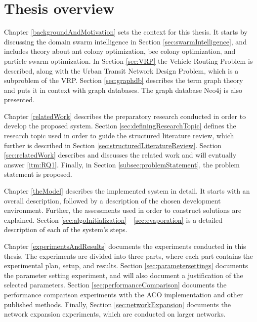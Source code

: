 \section{Thesis overview}



Chapter \ref{backgroundAndMotivation} sets the context for this thesis. It starts by discussing the domain swarm intelligence in Section \ref{sec:swarmIntelligence}, and includes theory about ant colony optimization, bee colony optimization, and particle swarm optimization. In Section \ref{sec:VRP} the Vehicle Routing Problem is described, along with the Urban Transit Network Design Problem, which is a subproblem of the VRP. Section \ref{sec:graphdb} describes the term graph theory and puts it in context with graph databases. The graph database Neo4j is also presented. 

Chapter \ref{relatedWork} describes the preparatory research conducted in order to develop the proposed system. Section \ref{sec:definingResearchTopic} defines the research topic used in order to guide the structured literature review\citep{kofod2014}, which further is described in Section \ref{sec:structuredLiteratureReview}. Section \ref{sec:relatedWork} describes and discusses the related work and will evntually answer \ref{itm:RQ1}. Finally, in Section \ref{subsec:problemStatement}, the problem statement is proposed.  

Chapter \ref{theModel} describes the implemented system in detail. It starts with an overall description, followed by a description of the chosen development environment. Further, the assessments used in order to construct solutions are explained. Section \ref{sec:algoInitialization} - \ref{sec:evaporation} is a detailed description of each of the system's steps.

Chapter \ref{experimentsAndResults} documents the experiments conducted in this thesis. The experiments are divided into three parts, where each part contains the experimental plan, setup, and results. Section \ref{sec:parametersettings} documents the parameter setting experiment, and will also document a justification of the selected parameters. Section \ref{sec:performanceComparison} documents the performance comparison experiments with the ACO implementation and other published methods. Finally, Section \ref{sec:networkExpansion} documents the network expansion experiments, which are conducted on larger networks. 

